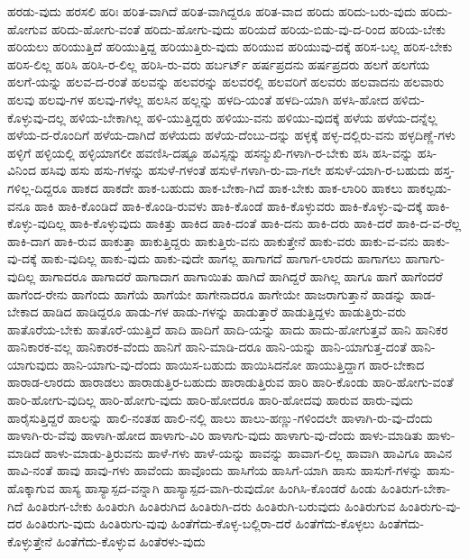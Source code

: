 {ಹರಡು-ವುದು
ಹರಸಲಿ
ಹರಿಃ
ಹರಿತ-ವಾಗಿದೆ
ಹರಿತ-ವಾಗಿದ್ದರೂ
ಹರಿತ-ವಾದ
ಹರಿದು
ಹರಿದು-ಬರು-ವುದು
ಹರಿದು-ಹೋಗುವ
ಹರಿದು-ಹೋಗು-ವಂತೆ
ಹರಿದು-ಹೋಗು-ವುದು
ಹರಿಯದೆ
ಹರಿಯ-ಬಿಡು-ವು-ದ-ರಿಂದ
ಹರಿಯ-ಬೇಕು
ಹರಿಯಲು
ಹರಿಯುತ್ತಿದೆ
ಹರಿಯುತ್ತಿದ್ದ
ಹರಿಯುತ್ತಿರು-ವುದು
ಹರಿಯುವ
ಹರಿಯುವು-ದಕ್ಕೆ
ಹರಿಸ-ಬಲ್ಲ
ಹರಿಸ-ಬೇಕು
ಹರಿಸ-ಲಿಲ್ಲ
ಹರಿಸಿ
ಹರಿಸಿ-ರ-ಲಿಲ್ಲ
ಹರಿಸಿ-ರು-ವರು
ಹರ್ಬರ್ಟ್
ಹರ್ಷಪ್ರದನು
ಹರ್ಷಪ್ರದರು
ಹಲಗೆ
ಹಲಗೆಯ
ಹಲಗೆ-ಯನ್ನು
ಹಲವ-ದ-ರಂತೆ
ಹಲವನ್ನು
ಹಲವರನ್ನು
ಹಲವರಲ್ಲಿ
ಹಲವರಿಗೆ
ಹಲವರು
ಹಲವಾದನು
ಹಲವಾರು
ಹಲವು
ಹಲವು-ಗಳ
ಹಲವು-ಗಳೆಲ್ಲ
ಹಲಸಿನ
ಹಲ್ಲನ್ನು
ಹಳದಿ-ಯಂತೆ
ಹಳದಿ-ಯಾಗಿ
ಹಳಸಿ-ಹೋದ
ಹಳಿದು-ಕೊಳ್ಳುವು-ದಲ್ಲ
ಹಳಿಯ-ಬೇಕಾಗಿಲ್ಲ
ಹಳಿ-ಯುತ್ತಿದ್ದರು
ಹಳಿಯು-ವನು
ಹಳಿಯು-ವುದಕ್ಕೆ
ಹಳೆಯ
ಹಳೆಯ-ದನ್ನೆಲ್ಲ
ಹಳೆಯ-ದ-ರೊಂದಿಗೆ
ಹಳೆಯ-ದಾಗಿದೆ
ಹಳೆಯದು
ಹಳೆಯ-ದೆಂಬು-ದನ್ನು
ಹಳ್ಳಕ್ಕೆ
ಹಳ್ಳ-ದಲ್ಲಿರು-ವನು
ಹಳ್ಳದಿಣ್ಣೆ-ಗಳು
ಹಳ್ಳಿಗೆ
ಹಳ್ಳಿಯಲ್ಲಿ
ಹಳ್ಳಿಯಾಗಲೀ
ಹವಣಿಸಿ-ದಷ್ಟೂ
ಹವಿಸ್ಸನ್ನು
ಹಸನ್ಮುಖಿ-ಗಳಾಗಿ-ರ-ಬೇಕು
ಹಸಿ
ಹಸಿ-ವನ್ನು
ಹಸಿ-ವಿನಿಂದ
ಹಸಿವು
ಹಸು
ಹಸು-ಗಳನ್ನು
ಹಸುಳೆ-ಗಳಂತೆ
ಹಸುಳೆ-ಗಳಾಗಿ-ರು-ವಾ-ಗಲೇ
ಹಸುಳೆ-ಯಾಗಿ-ರ-ಬಹುದು
ಹಸ್ತ-ಗಳಿಲ್ಲ-ದಿದ್ದರೂ
ಹಾಕದ
ಹಾಕದೇ
ಹಾಕ-ಬಹುದು
ಹಾಕ-ಬೇಕಾ-ಗಿದೆ
ಹಾಕ-ಬೇಕು
ಹಾಕ-ಲಾರಿರಿ
ಹಾಕಲು
ಹಾಕಲ್ಪಡು-ವನೂ
ಹಾಕಿ
ಹಾಕಿ-ಕೊಂಡಿದೆ
ಹಾಕಿ-ಕೊಂಡಿ-ರುವಳು
ಹಾಕಿ-ಕೊಂಡೆ
ಹಾಕಿ-ಕೊಳ್ಳುವರು
ಹಾಕಿ-ಕೊಳ್ಳು-ವು-ದಕ್ಕೆ
ಹಾಕಿ-ಕೊಳ್ಳು-ವುದಿಲ್ಲ
ಹಾಕಿ-ಕೊಳ್ಳುವುದು
ಹಾಕಿತ್ತು
ಹಾಕಿದ
ಹಾಕಿ-ದಂತೆ
ಹಾಕಿ-ದನು
ಹಾಕಿ-ದರು
ಹಾಕಿ-ದರೆ
ಹಾಕಿ-ದ-ವ-ರೆಲ್ಲ
ಹಾಕಿ-ದಾಗ
ಹಾಕಿ-ರುವ
ಹಾಕುತ್ತಾ
ಹಾಕುತ್ತಿದ್ದರು
ಹಾಕುತ್ತಿರು-ವನು
ಹಾಕುತ್ತೇನೆ
ಹಾಕು-ವರು
ಹಾಕು-ವ-ವನು
ಹಾಕು-ವು-ದಕ್ಕೆ
ಹಾಕು-ವುದಿಲ್ಲ
ಹಾಕು-ವುದು
ಹಾಕು-ವುದೇ
ಹಾಗಲ್ಲ
ಹಾಗಾಗದೆ
ಹಾಗಾಗ-ಲಾರದು
ಹಾಗಾಗಲು
ಹಾಗಾಗು-ವುದಿಲ್ಲ
ಹಾಗಾದರೂ
ಹಾಗಾದರೆ
ಹಾಗಾದಾಗ
ಹಾಗಾಯಿತು
ಹಾಗಿದೆ
ಹಾಗಿದ್ದರೆ
ಹಾಗಿಲ್ಲ
ಹಾಗೂ
ಹಾಗೆ
ಹಾಗೆಂದರೆ
ಹಾಗೆಂದ-ರೇನು
ಹಾಗೆಂದು
ಹಾಗೆಯೆ
ಹಾಗೆಯೇ
ಹಾಗೇನಾದರೂ
ಹಾಗೇಯೇ
ಹಾಜರಾಗುತ್ತಾನೆ
ಹಾಡನ್ನು
ಹಾಡ-ಬೇಕಾದ
ಹಾಡಿದ
ಹಾಡಿದ್ದರೂ
ಹಾಡು-ಗಳ
ಹಾಡು-ಗಳನ್ನು
ಹಾಡುತ್ತಾರೆ
ಹಾಡುತ್ತಿದ್ದಳು
ಹಾಡುತ್ತಿರು-ವರು
ಹಾತೊರೆಯ-ಬೇಕು
ಹಾತೊರೆ-ಯುತ್ತಿದೆ
ಹಾದಿ
ಹಾದಿಗೆ
ಹಾದಿ-ಯನ್ನು
ಹಾದು
ಹಾದು-ಹೋಗುತ್ತವೆ
ಹಾನಿ
ಹಾನಿಕರ
ಹಾನಿಕಾರಕ-ವಲ್ಲ
ಹಾನಿಕಾರಕ-ವೆಂದು
ಹಾನಿಗೆ
ಹಾನಿ-ಮಾಡಿ-ದರೂ
ಹಾನಿ-ಯನ್ನು
ಹಾನಿ-ಯಾಗುತ್ತ-ದಂತೆ
ಹಾನಿ-ಯಾಗುವುದು
ಹಾನಿ-ಯಾಗು-ವು-ದೆಂದು
ಹಾಯಿಸ-ಬಹುದು
ಹಾಯಿಸಿದನೋ
ಹಾಯುತ್ತಿದ್ದಾಗ
ಹಾರ-ಬೇಕಾದ
ಹಾರಾಡ-ಲಾರದು
ಹಾರಾಡಲು
ಹಾರಾಡುತ್ತಿರ-ಬಹುದು
ಹಾರಾಡುತ್ತಿರುವ
ಹಾರಿ
ಹಾರಿ-ಕೊಂಡು
ಹಾರಿ-ಹೋಗು-ವಂತೆ
ಹಾರಿ-ಹೋಗು-ವುದಿಲ್ಲ
ಹಾರಿ-ಹೋಗು-ವುದು
ಹಾರಿ-ಹೋದರೂ
ಹಾರಿ-ಹೋದವು
ಹಾರುವ
ಹಾರು-ವುದು
ಹಾರೈಸುತ್ತಿದ್ದರೆ
ಹಾಲನ್ನು
ಹಾಲಿ-ನಂತಹ
ಹಾಲಿ-ನಲ್ಲಿ
ಹಾಲು
ಹಾಲು-ಹಣ್ಣು-ಗಳಿಂದಲೇ
ಹಾಳಾಗಿ-ರು-ವು-ದೆಂದು
ಹಾಳಾಗಿ-ರು-ವೆವು
ಹಾಳಾಗಿ-ಹೋದ
ಹಾಳಾಗು-ವಿರಿ
ಹಾಳಾಗು-ವುದು
ಹಾಳಾಗು-ವು-ದೆಂದು
ಹಾಳು-ಮಾಡಿತು
ಹಾಳು-ಮಾಡಿದೆ
ಹಾಳು-ಮಾಡು-ತ್ತಿರುವನು
ಹಾಳೆ-ಗಳು
ಹಾಳೆ-ಯನ್ನು
ಹಾವನ್ನು
ಹಾವಾಗ-ಲಿಲ್ಲ
ಹಾವಾಗಿ
ಹಾವಿಗೂ
ಹಾವಿನ
ಹಾವಿ-ನಂತೆ
ಹಾವು
ಹಾವು-ಗಳು
ಹಾವೆಂದು
ಹಾವೊಂದು
ಹಾಸಿಗೆಯ
ಹಾಸಿಗೆ-ಯಾಗಿ
ಹಾಸು
ಹಾಸುಗೆ-ಗಳನ್ನು
ಹಾಸು-ಹೊಕ್ಕಾಗುವ
ಹಾಸ್ಯ
ಹಾಸ್ಯಾಸ್ಪದ-ವನ್ನಾಗಿ
ಹಾಸ್ಯಾಸ್ಪದ-ವಾಗಿ-ರುವುದೋ
ಹಿಂಗಿಸಿ-ಕೊಂಡರೆ
ಹಿಂಡು
ಹಿಂತಿರುಗ-ಬೇಕಾ-ಗಿದೆ
ಹಿಂತಿರುಗ-ಬೇಕು
ಹಿಂತಿರುಗಿ
ಹಿಂತಿರುಗಿದ
ಹಿಂತಿರುಗಿ-ದರು
ಹಿಂತಿರುಗಿ-ಬರುವುದು
ಹಿಂತಿರುಗುವ
ಹಿಂತಿರುಗು-ವು-ದರ
ಹಿಂತಿರುಗು-ವುದು
ಹಿಂತಿರುಗು-ವುವು
ಹಿಂತೆಗೆದು-ಕೊಳ್ಳ-ಬಲ್ಲಿರಾ-ದರೆ
ಹಿಂತೆಗೆದು-ಕೊಳ್ಳಲು
ಹಿಂತೆಗೆದು-ಕೊಳ್ಳುತ್ತೇನೆ
ಹಿಂತೆಗೆದು-ಕೊಳ್ಳುವ
ಹಿಂತೆರಳು-ವುದು
}
